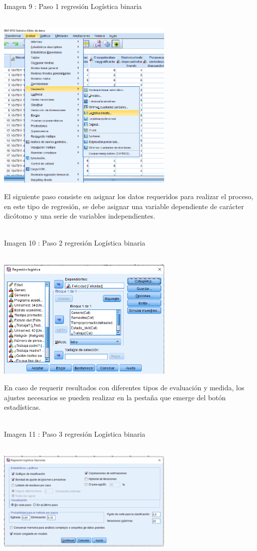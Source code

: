 \documentclass[conference]{IEEEtran}
\begin{document}
\begin{center}
\caption{Imagen 9 : Paso 1 regresión Logística binaria}\\
\includegraphics[width=8.5cm]{imagenes/Paso3}
\end{center}
El siguiente paso consiste en asignar los datos requeridos para realizar el proceso, en este tipo de regresión, se debe asignar una variable dependiente de carácter dicótomo y una serie de variables independientes.\\\\
\begin{center}
\caption{Imagen 10 : Paso 2 regresión Logística binaria}\\
\includegraphics[width=8.5cm]{imagenes/Paso10}
\end{center}
   En caso de requerir resultados con diferentes tipos de evaluación y medida, los ajustes necesarios se pueden realizar en la pestaña que emerge del botón estadísticas. \\\\
\begin{center}
\caption{Imagen 11 : Paso 3 regresión Logística binaria}\\
\includegraphics[width=8.5cm]{imagenes/IMAGEN10.png}
\end{center}
\end{document}
